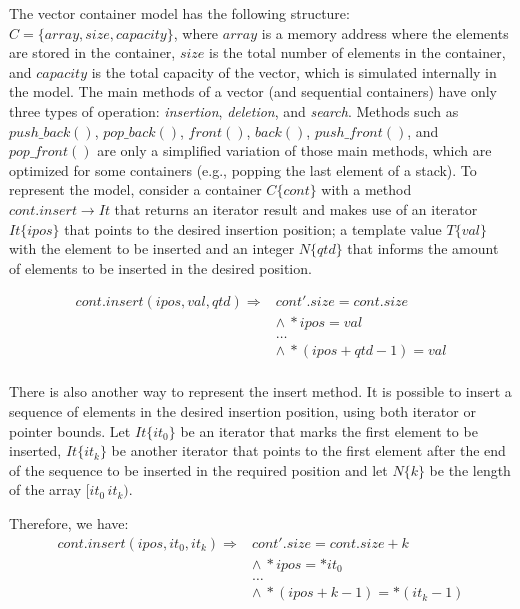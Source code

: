 \documentclass[a4paper]{llncs}
\begin{document}
The vector container model has the following structure:
$C = \{ array, size, capacity\}$,
where $array$ is a memory address where the elements are stored in the container,
$size$ is the total number of elements in the container, and $capacity$
is the total capacity of the vector, which is simulated internally in the model.
The main methods of a vector (and sequential containers) have only
three types of operation: \textit{insertion}, \textit{deletion}, and \textit{search}.
Methods such as $push\_back\left(\right)$, $pop\_back\left(\right)$, $front\left(\right)$,
$back\left(\right)$, $push\_front\left(\right)$, and $pop\_front\left(\right)$ are only
a simplified variation of those main methods, which are optimized for some containers
(e.g., popping the last element of a stack).
%
To represent the model, consider a container $C\{cont\}$ with a method
$cont.insert \rightarrow It$ that returns an iterator result and
makes use of an iterator $It\{ipos\}$ that points to the desired
insertion position; a template value $T\{val\}$ with the element
to be inserted and an integer $N\{qtd\}$ that informs the amount
of elements to be inserted in the desired position.

\[\begin{array}{ll}
cont.insert(ipos, val, qtd) \Longrightarrow & cont'.size = cont.size \\
  & \wedge \: *ipos = val \\
  & \ldots \\
  & \wedge \: *(ipos + qtd - 1) = val \\
\end{array}\]

There is also another way to represent the insert method.
It is possible to insert a sequence of elements in the desired
insertion position, using both iterator or pointer bounds.
Let $It\{it_0\}$ be an iterator that marks the first element
to be inserted, $It\{it_k\}$ be another iterator that
points to the first element after the end of the sequence to be inserted
in the required position and let $N\{k\}$ be the length of the array $[it_0\, it_k)$.

Therefore, we have:\\

\[\begin{array}{ll}
cont.insert(ipos, it_0, it_k) \Longrightarrow & cont'.size = cont.size + k\\
  & \wedge \: *ipos = *it_0 \\
  & \ldots \\
  & \wedge \: *(ipos + k - 1) = *(it_k - 1)
\end{array}\]
\end{document}
